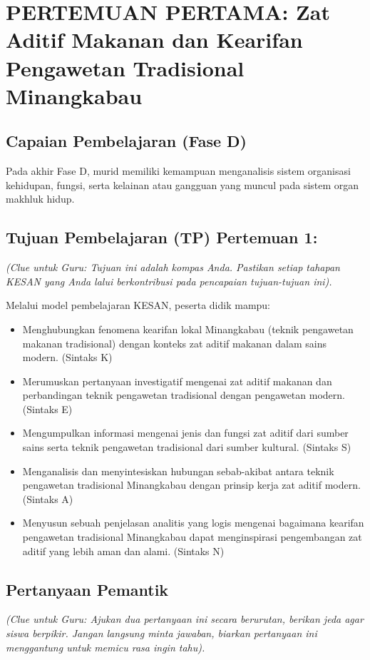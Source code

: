 \documentclass[a4paper,12pt]{article}
\begin{document}
\section{PERTEMUAN PERTAMA: Zat Aditif Makanan dan Kearifan Pengawetan Tradisional Minangkabau}

\subsection{Capaian Pembelajaran (Fase D)}
Pada akhir Fase D, murid memiliki kemampuan menganalisis sistem organisasi kehidupan, fungsi, serta kelainan atau gangguan yang muncul pada sistem organ makhluk hidup.

\subsection{Tujuan Pembelajaran (TP) Pertemuan 1:}
\textit{(Clue untuk Guru: Tujuan ini adalah kompas Anda. Pastikan setiap tahapan KESAN yang Anda lalui berkontribusi pada pencapaian tujuan-tujuan ini).}

Melalui model pembelajaran KESAN, peserta didik mampu:
\begin{itemize}
\item Menghubungkan fenomena kearifan lokal Minangkabau (teknik pengawetan makanan tradisional) dengan konteks zat aditif makanan dalam sains modern. (Sintaks K)
\item Merumuskan pertanyaan investigatif mengenai zat aditif makanan dan perbandingan teknik pengawetan tradisional dengan pengawetan modern. (Sintaks E)
\item Mengumpulkan informasi mengenai jenis dan fungsi zat aditif dari sumber sains serta teknik pengawetan tradisional dari sumber kultural. (Sintaks S)
\item Menganalisis dan menyintesiskan hubungan sebab-akibat antara teknik pengawetan tradisional Minangkabau dengan prinsip kerja zat aditif modern. (Sintaks A)
\item Menyusun sebuah penjelasan analitis yang logis mengenai bagaimana kearifan pengawetan tradisional Minangkabau dapat menginspirasi pengembangan zat aditif yang lebih aman dan alami. (Sintaks N)
\end{itemize}

\subsection{Pertanyaan Pemantik}
\textit{(Clue untuk Guru: Ajukan dua pertanyaan ini secara berurutan, berikan jeda agar siswa berpikir. Jangan langsung minta jawaban, biarkan pertanyaan ini menggantung untuk memicu rasa ingin tahu).}
\end{document}
